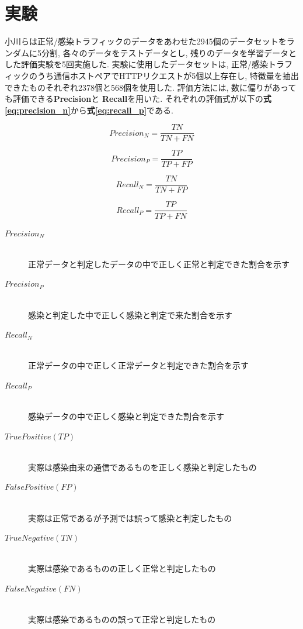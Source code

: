\documentclass[twocolumn,10pt]{ltjsarticle}
\begin{document}
\section{実験}
小川らは正常/感染トラフィックのデータをあわせた2945個のデータセットをランダムに5分割, 各々のデータをテストデータとし, 
残りのデータを学習データとした評価実験を5回実施した. 
実験に使用したデータセットは, 正常/感染トラフィックのうち通信ホストペアでHTTPリクエストが5個以上存在し, 
特徴量を抽出できたものそれぞれ2378個と568個を使用した. 評価方法には, 数に偏りがあっても評価できる\textbf{Precision}と
\textbf{Recall}を用いた. それぞれの評価式が以下の\textbf{式\ref{eq:precision_n}}から\textbf{式\ref{eq:recall_p}}である. 

\begin{equation}
    \label{eq:precision_n}
    Precision_N = \frac{TN}{TN+FN}
\end{equation}

\begin{equation}
    \label{eq:precision_p}
    Precision_P = \frac{TP}{TP+FP}
\end{equation}

\begin{equation}
    \label{eq:recall_n}
    Recall_N = \frac{TN}{TN+FP}
\end{equation}

\begin{equation}
    \label{eq:recall_p}
    Recall_P = \frac{TP}{TP+FN}
\end{equation}

\begin{description}
    \item[$Precision_N$]~\\
    正常データと判定したデータの中で正しく正常と判定できた割合を示す
    \item[$Precision_P$]~\\
    感染と判定した中で正しく感染と判定で来た割合を示す
    \item[$Recall_N$]~\\
    正常データの中で正しく正常データと判定できた割合を示す
    \item[$Recall_P$]~\\
    感染データの中で正しく感染と判定できた割合を示す
    \item[$True Positive(TP)$]~\\
    実際は感染由来の通信であるものを正しく感染と判定したもの
    \item[$False Positive(FP)$]~\\
    実際は正常であるが予測では誤って感染と判定したもの
    \item[$True Negative(TN)$]~\\
    実際は感染であるものの正しく正常と判定したもの
    \item[$False Negative(FN)$]~\\
    実際は感染であるものの誤って正常と判定したもの
\end{description}
\end{document}

